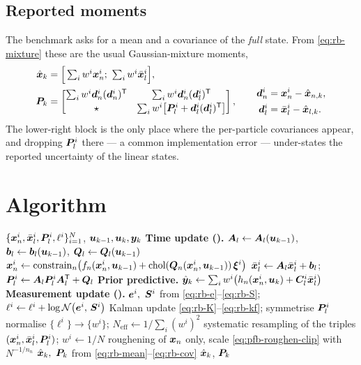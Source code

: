 \subsection{Reported moments}
The benchmark asks for a mean and a covariance of the \emph{full} state.  From
\eqref{eq:rb-mixture} these are the usual Gaussian-mixture moments,
\begin{align}
  \hat{\bm{x}}_k &= \Big[\textstyle\sum_i w^i\bm{x}_n^i;\ \sum_i w^i\bar{\bm{x}}_l^i\Big], \label{eq:rb-mean}\\
  \bm{P}_k &= \begin{bmatrix}
    \sum_i w^i \bm d_n^i (\bm d_n^i)^{\mathsf{T}} & \sum_i w^i \bm d_n^i (\bm d_l^i)^{\mathsf{T}} \\[2pt]
    \star & \sum_i w^i\big[\bm{P}_l^i + \bm d_l^i(\bm d_l^i)^{\mathsf{T}}\big]
  \end{bmatrix},
  \qquad
  \begin{aligned}
    \bm d_n^i &= \bm{x}_n^i - \hat{\bm{x}}_{n,k},\\
    \bm d_l^i &= \bar{\bm{x}}_l^i - \hat{\bm{x}}_{l,k}.
  \end{aligned}
  \label{eq:rb-cov}
\end{align}
The lower-right block is the only place where the per-particle covariances appear, and dropping
$\bm{P}_l^i$ there --- a common implementation error --- under-states the reported uncertainty of the
linear states.

\section{Algorithm}
\begin{algorithm}[H]
\caption{RBPF --- one sampling period}
\begin{algorithmic}[1]
\Require $\{\bm{x}_n^i, \bar{\bm{x}}_l^i, \bm{P}_l^i, \ell^i\}_{i=1}^N$, $\bm{u}_{k-1},\bm{u}_k,\bm{y}_k$
\State \textbf{Time update ().} $\bm{A}_l \gets \bm{A}_l(\bm{u}_{k-1})$, $\bm b_l\gets\bm b_l(\bm{u}_{k-1})$, $\bm{Q}_l \gets \bm{Q}_l(\bm{u}_{k-1})$
  \State $\bm{x}_n^i \gets \operatorname{constrain}_n\!\big(f_n(\bm{x}_n^i,\bm{u}_{k-1}) + \operatorname{chol}(\bm{Q}_n(\bm{x}_n^i,\bm{u}_{k-1}))\,\bm\xi^i\big)$
  \State $\bar{\bm{x}}_l^i \gets \bm{A}_l\bar{\bm{x}}_l^i + \bm b_l$; \quad $\bm{P}_l^i \gets \bm{A}_l\bm{P}_l^i\bm{A}_l^{\mathsf{T}} + \bm{Q}_l$
\EndFor
\State \textbf{Prior predictive.} $\hat{\bm{y}}_k \gets \sum_i w^i\big(h_n(\bm{x}_n^i,\bm{u}_k) + \bm{C}_l^i\bar{\bm{x}}_l^i\big)$
\State \textbf{Measurement update ().}
  \State $\bm e^i,\ \bm{S}^i$ from \eqref{eq:rb-e}--\eqref{eq:rb-S}; \quad $\ell^i \gets \ell^i + \log\mathcal{N}\!\left(\bm e^i,\,\bm{S}^i\right)$
  \State Kalman update \eqref{eq:rb-K}--\eqref{eq:rb-kf}; symmetrise $\bm{P}_l^i$
\EndFor
\State normalise $\{\ell^i\}\to\{w^i\}$; \; $N_{\mathrm{eff}} \gets 1/\sum_i (w^i)^2$
  \State systematic resampling of the triples $(\bm{x}_n^i,\bar{\bm{x}}_l^i,\bm{P}_l^i)$; \; $w^i\gets 1/N$
  \State roughening of $\bm{x}_n$ only, scale \eqref{eq:pfb-roughen-clip} with $N^{-1/n_n}$
\EndIf
\State $\hat{\bm{x}}_k,\ \bm{P}_k$ from \eqref{eq:rb-mean}--\eqref{eq:rb-cov}
\Ensure $\hat{\bm{x}}_k$, $\bm{P}_k$
\end{algorithmic}
\end{algorithm}

